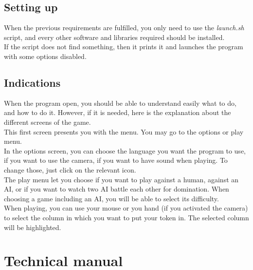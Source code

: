 \documentclass[12pt, a4paper, oneside]{report}
\begin{document}
	\section{Setting up}
	When the previous requirements are fulfilled, you only need to use the \textit{launch.sh} script, and every other software and libraries required should be installed. \\
	If the script does not find something, then it prints it and launches the program with some options disabled.

	\section{Indications}
	When the program open, you should be able to understand easily what to do, and how to do it. However, if it is needed, here is the explanation about the different screens of the game. \\

	This first screen presents you with the menu. You may go to the options or play menu. \\
	\hspace*{1cm} In the options screen, you can choose the language you want the program to use, if you want to use the camera, if you want to have sound when playing. To change those, just click on the relevant icon. \\
	\hspace*{1cm} The play menu let you choose if you want to play against a human, against an AI, or if you want to watch two AI battle each other for domination. When choosing a game including an AI, you will be able to select its difficulty. \\

	When playing, you can use your mouse or you hand (if you activated the camera) to select the column in which you want to put your token in. The selected column will be highlighted.

	\chapter{Technical manual}
\end{document}
